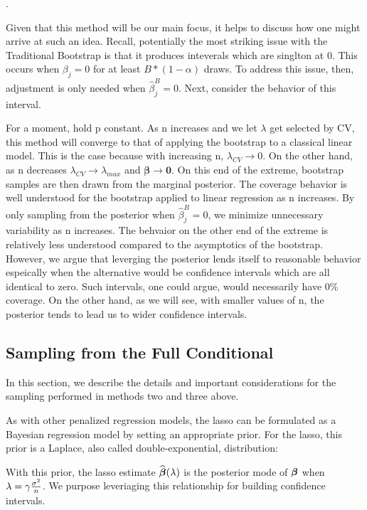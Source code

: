 .

Given that this method will be our main focus, it helps to discuss how one might arrive at such an idea. Recall, potentially the most striking issue with the Traditional Bootstrap is that it produces inteverals which are singlton at 0. This occurs when $\beta_j = 0$ for at least $B * (1 - \alpha)$ draws. To address this issue, then, adjustment is only needed when $\hat{\beta}_j^{B} = 0$. Next, consider the behavior of this interval.

For a moment, hold p constant. As n increases and we let $\lambda$ get selected by CV, this method will converge to that of applying the bootstrap to a classical linear model. This is the case because with increasing n, $\lambda_{CV} \rightarrow 0$. On the other hand, as n decreases $\lambda_{CV} \rightarrow \lambda_{max}$ and $\boldsymbol{\beta} \rightarrow \boldsymbol{0}$. On this end of the extreme, bootstrap samples are then drawn from the marginal posterior. The coverage behavior is well understood for the bootstrap applied to linear regression as n increases. By only sampling from the posterior when $\hat{\beta}_j^B = 0$, we minimize unnecessary variability as n increases. The behvaior on the other end of the extreme is relatively less understood compared to the asymptotics of the bootstrap. However, we argue that leverging the posterior lends itself to reasonable behavior espeically when the alternative would be confidence intervals which are all identical to zero. Such intervals, one could argue, would necessarily have 0\% coverage. On the other hand, as we will see, with smaller values of n, the posterior tends to lead us to wider confidence intervals.

\subsection{Sampling from the Full Conditional}

In this section, we describe the details and important considerations for the sampling performed in methods two and three above.

As with other penalized regression models, the lasso can be formulated as a Bayesian regression model by setting an appropriate prior. For the lasso, this prior is a Laplace, also called double-exponential, distribution:


With this prior, the lasso estimate $\widehat{\boldsymbol{\beta}}(\lambda)$ is the posterior mode of $\boldsymbol{\beta}$ when $\lambda = \gamma \frac{\sigma^2}{n}$. We purpose leveriaging this relationship for building confidence intervals.

